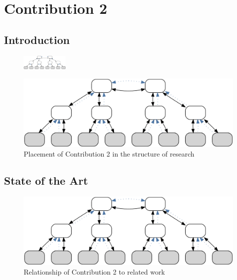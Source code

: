 \cleardoublepage
\chapter{Contribution 2}\label{sec:contrib2}\minitoc\vspace{.5cm}

\section{Introduction}

\begin{figure}
    \centering
    \includegraphics[width=0.2\textwidth]{resources/images/example3}
\end{figure}



\begin{figure}[H]
    \centering
    \includegraphics[width=.55\textwidth]{resources/images/example3}
    \caption{Placement of Contribution 2 in the structure of research}\label{fig:hourglass:contrib2}
\end{figure}

\section{State of the Art}


\begin{figure}[htbp]
    \centering
    \includegraphics[width=.6\textwidth]{resources/images/example3}
    \caption{Relationship of Contribution 2 to related work}\label{fig:contrib2:related}
\end{figure}

